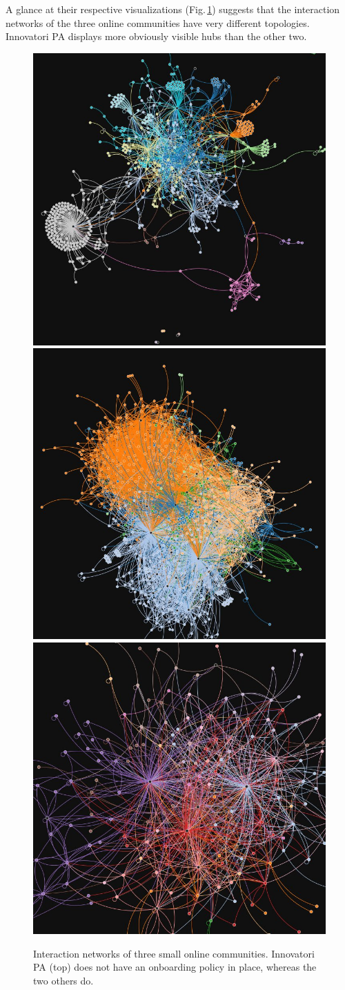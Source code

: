 \documentclass{nws}
\begin{document}
A glance at their respective visualizations (Fig.\,\ref{fig:NetViz}) suggests that the interaction networks of the three online communities have very different topologies. Innovatori PA displays more obviously visible hubs than the other two. 

\begin{figure}
\centering
	\includegraphics[width=.6\linewidth]{./Pictures/innovatoripa_01.jpg}\label{fig:InnoNet}
	\includegraphics[width=.6\linewidth]{./Pictures/edgeryders_02.jpg}\label{fig:EdgeNet}
  	\includegraphics[width=.6\linewidth]{./Pictures/matera2019_01.jpg}\label{fig:MT2019Net}
  \caption{Interaction networks of three small online communities. Innovatori PA (top) does not have an onboarding policy in place, whereas the two others do.} 
 \label{fig:NetViz}
\end{figure}
\end{document}
